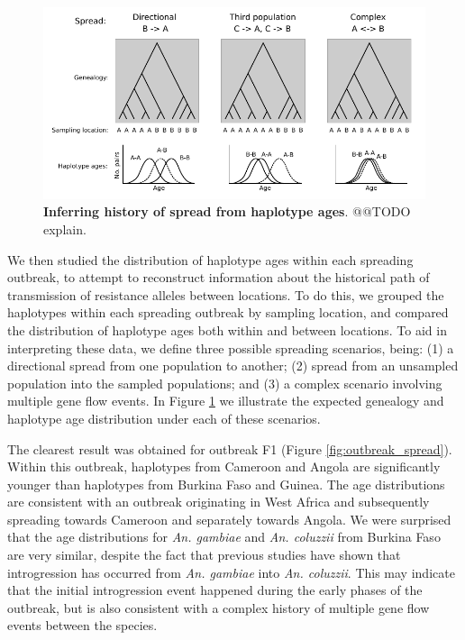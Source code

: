 \documentclass[a4paper,11pt,abstracton,hidelinks]{scrartcl}
\begin{document}
%
\begin{figure}[!b]
  \includegraphics[width=1.1\linewidth,center]{artwork/spreading.pdf}
  \caption{\textbf{Inferring history of spread from haplotype ages}. @@TODO explain.}
  \label{fig:spreading_cartoon}
\end{figure}


%
We then studied the distribution of haplotype ages within each spreading outbreak, to attempt to reconstruct information about the historical path of transmission of resistance alleles between locations.
%
To do this, we grouped the haplotypes within each spreading outbreak by sampling location, and compared the distribution of haplotype ages both within and between locations.
%
To aid in interpreting these data, we define three possible spreading scenarios, being: (1) a directional spread from one population to another; (2) spread from an unsampled population into the sampled populations; and (3) a complex scenario involving multiple gene flow events.
%
In Figure \ref{fig:spreading_cartoon} we illustrate the expected genealogy and haplotype age distribution under each of these scenarios.
%


%
The clearest result was obtained for outbreak F1 (Figure \ref{fig:outbreak_spread}).
%
Within this outbreak, haplotypes from Cameroon and Angola are significantly younger than haplotypes from Burkina Faso and Guinea.
%
The age distributions are consistent with an outbreak originating in West Africa and subsequently spreading towards Cameroon and separately towards Angola.
%
We were surprised that the age distributions for \textit{An. gambiae} and \textit{An. coluzzii} from Burkina Faso are very similar, despite the fact that previous studies have shown that introgression has occurred from \textit{An. gambiae} into \textit{An. coluzzii}.
%
This may indicate that the initial introgression event happened during the early phases of the outbreak, but is also consistent with a complex history of multiple gene flow events between the species.
\end{document}
